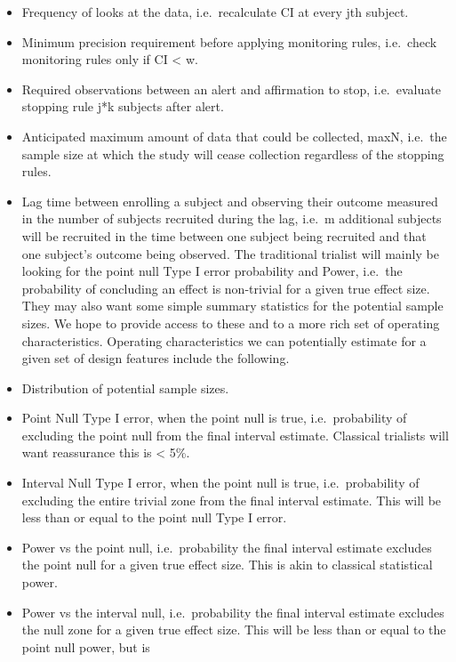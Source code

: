 \documentclass[12pt,oneside]{book}
\providecommand{\tightlist}{%
  \setlength{\itemsep}{0pt}\setlength{\parskip}{0pt}}
\newlength{\li}\setlength{\li}{14.48pt}
\newlength{\di}\setlength{\di}{-3.5mm}
\theoremstyle{definition}
\theoremstyle{definition}
\theoremstyle{definition}
\theoremstyle{remark}
\begin{document}
\begin{itemize}
\tightlist
\item
  Frequency of looks at the data, i.e.~recalculate CI at every jth
  subject.
\item
  Minimum precision requirement before applying monitoring rules,
  i.e.~check monitoring rules only if \textbar{}CI\textbar{} \textless{}
  w.
\item
  Required observations between an alert and affirmation to stop,
  i.e.~evaluate stopping rule j*k subjects after alert.
\item
  Anticipated maximum amount of data that could be collected, maxN,
  i.e.~the sample size at which the study will cease collection
  regardless of the stopping rules.
\item
  Lag time between enrolling a subject and observing their outcome
  measured in the number of subjects recruited during the lag, i.e.~m
  additional subjects will be recruited in the time between one subject
  being recruited and that one subject's outcome being observed. The
  traditional trialist will mainly be looking for the point null Type I
  error probability and Power, i.e.~the probability of concluding an
  effect is non-trivial for a given true effect size. They may also want
  some simple summary statistics for the potential sample sizes. We hope
  to provide access to these and to a more rich set of operating
  characteristics. Operating characteristics we can potentially estimate
  for a given set of design features include the following.
\item
  Distribution of potential sample sizes.
\item
  Point Null Type I error, when the point null is true, i.e.~probability
  of excluding the point null from the final interval estimate.
  Classical trialists will want reassurance this is \textless{} 5\%.
\item
  Interval Null Type I error, when the point null is true,
  i.e.~probability of excluding the entire trivial zone from the final
  interval estimate. This will be less than or equal to the point null
  Type I error.
\item
  Power vs the point null, i.e.~probability the final interval estimate
  excludes the point null for a given true effect size. This is akin to
  classical statistical power.
\item
  Power vs the interval null, i.e.~probability the final interval
  estimate excludes the null zone for a given true effect size. This
  will be less than or equal to the point null power, but is

\end{itemize}
\end{document}
